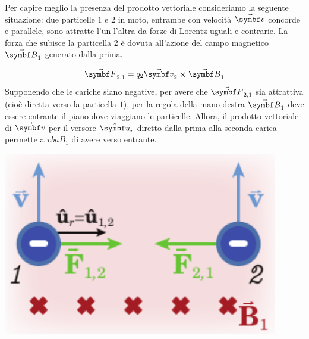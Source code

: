 \begin{example}
	Per capire meglio la presenza del prodotto vettoriale consideriamo la seguente situazione: due particelle $1$ e $2$ in moto, entrambe con velocità $\vba{v}$ concorde e parallele, sono attratte l'un l'altra da forze di Lorentz  uguali e contrarie. La forza che subisce la particella $2$ è dovuta all'azione del campo magnetico $\vba{B}_1$ generato dalla prima.~\\
	\begin{minipage}{0.6\textwidth}
		\begin{equation*}
			\vba{F}_{2,1}=q_2\vba{v}_2\cross\vba{B}_1
		\end{equation*}
	Supponendo che le cariche siano negative, per avere che $\vba{F}_{2,1}$ sia attrattiva (cioè diretta verso la particella $1$), per la regola della mano destra $\vba{B}_1$ deve essere entrante il piano dove viaggiano le particelle. Allora, il prodotto vettoriale di $\vba{v}$ per il versore $\vbh{u}_r$ diretto dalla prima alla seconda carica permette a $vba{B}_1$ di avere verso entrante.
	\end{minipage}\hspace{5pt}
	\begin{minipage}{0.39\textwidth}
		\begin{center}
			\includegraphics[width=0.9\textwidth]{images/chp8/chp8biotsavartcariche.pdf}
		\end{center}
	\end{minipage}
\end{example}
